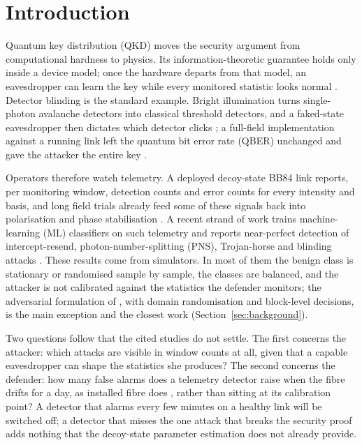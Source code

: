 \section{Introduction}

Quantum key distribution (QKD) moves the security argument from computational hardness to physics. Its information-theoretic guarantee holds only inside a device model; once the hardware departs from that model, an eavesdropper can learn the key while every monitored statistic looks normal \cite{scarani2009,xu2020}. Detector blinding is the standard example. Bright illumination turns single-photon avalanche detectors into classical threshold detectors, and a faked-state eavesdropper then dictates which detector clicks \cite{makarov2005,lydersen2010}; a full-field implementation against a running link left the quantum bit error rate (QBER) unchanged and gave the attacker the entire key \cite{gerhardt2011}.

Operators therefore watch telemetry. A deployed decoy-state BB84 link \cite{bennett2014,hwang2003,lo2005,wang2005} reports, per monitoring window, detection counts and error counts for every intensity and basis, and long field trials already feed some of these signals back into polarisation and phase stabilisation \cite{dixon2010,dynes2012,stucki2011}. A recent strand of work trains machine-learning (ML) classifiers on such telemetry and reports near-perfect detection of intercept-resend, photon-number-splitting (PNS), Trojan-horse and blinding attacks \cite{mao2020,liao2022,alkuwari2026,isha2026,mohamed2026}. These results come from simulators. In most of them the benign class is stationary or randomised sample by sample, the classes are balanced, and the attacker is not calibrated against the statistics the defender monitors; the adversarial formulation of \cite{mohamed2026}, with domain randomisation and block-level decisions, is the main exception and the closest work (Section~\ref{sec:background}).

Two questions follow that the cited studies do not settle. The first concerns the attacker: which attacks are visible in window counts at all, given that a capable eavesdropper can shape the statistics she produces? The second concerns the defender: how many false alarms does a telemetry detector raise when the fibre drifts for a day, as installed fibre does \cite{dixon2010,dynes2012}, rather than sitting at its calibration point? A detector that alarms every few minutes on a healthy link will be switched off; a detector that misses the one attack that breaks the security proof adds nothing that the decoy-state parameter estimation does not already provide.

